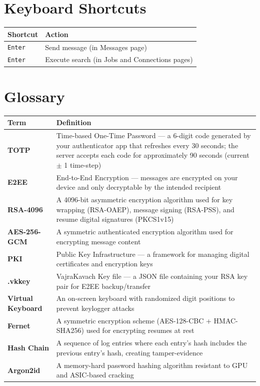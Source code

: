 \documentclass[12pt,a4paper]{article}
\begin{document}
\section{Keyboard Shortcuts}

\begin{longtable}{p{4cm}p{9.5cm}}
\toprule
\textbf{Shortcut} & \textbf{Action} \\
\midrule
\texttt{Enter} & Send message (in Messages page) \\
\texttt{Enter} & Execute search (in Jobs and Connections pages) \\
\bottomrule
\end{longtable}

\section{Glossary}

\begin{longtable}{p{4cm}p{9.5cm}}
\toprule
\textbf{Term} & \textbf{Definition} \\
\midrule
\textbf{TOTP} & Time-based One-Time Password --- a 6-digit code generated by your authenticator app that refreshes every 30 seconds; the server accepts each code for approximately 90 seconds (current $\pm$ 1 time-step) \\
\textbf{E2EE} & End-to-End Encryption --- messages are encrypted on your device and only decryptable by the intended recipient \\
\textbf{RSA-4096} & A 4096-bit asymmetric encryption algorithm used for key wrapping (RSA-OAEP), message signing (RSA-PSS), and resume digital signatures (PKCS1v15) \\
\textbf{AES-256-GCM} & A symmetric authenticated encryption algorithm used for encrypting message content \\
\textbf{PKI} & Public Key Infrastructure --- a framework for managing digital certificates and encryption keys \\
\textbf{.vkkey} & VajraKavach Key file --- a JSON file containing your RSA key pair for E2EE backup/transfer \\
\textbf{Virtual Keyboard} & An on-screen keyboard with randomized digit positions to prevent keylogger attacks \\
\textbf{Fernet} & A symmetric encryption scheme (AES-128-CBC + HMAC-SHA256) used for encrypting resumes at rest \\
\textbf{Hash Chain} & A sequence of log entries where each entry's hash includes the previous entry's hash, creating tamper-evidence \\
\textbf{Argon2id} & A memory-hard password hashing algorithm resistant to GPU and ASIC-based cracking \\
\bottomrule
\end{longtable}
\end{document}
